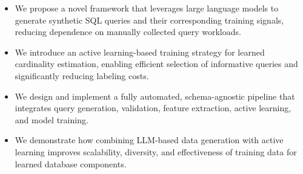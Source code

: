 \begin{itemize}
    \item We propose a novel framework that leverages large language models to generate synthetic SQL queries and their corresponding training signals, reducing dependence on manually collected query workloads.
    
    \item We introduce an active learning-based training strategy for learned cardinality estimation, enabling efficient selection of informative queries and significantly reducing labeling costs.
    
    \item We design and implement a fully automated, schema-agnostic pipeline that integrates query generation, validation, feature extraction, active learning, and model training.
    
    \item We demonstrate how combining LLM-based data generation with active learning improves scalability, diversity, and effectiveness of training data for learned database components.
\end{itemize}
